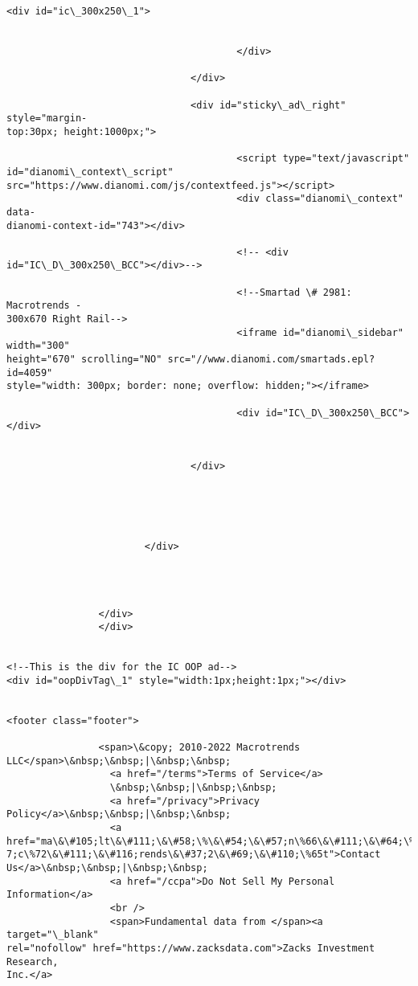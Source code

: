 \documentclass[11pt]{article}
\begin{document}
\begin{Verbatim}[commandchars=\\\{\}]
                                        <div id="ic\_300x250\_1">


                                        </div>

                                </div>

                                <div id="sticky\_ad\_right" style="margin-
top:30px; height:1000px;">

                                        <script type="text/javascript"
id="dianomi\_context\_script"
src="https://www.dianomi.com/js/contextfeed.js"></script>
                                        <div class="dianomi\_context" data-
dianomi-context-id="743"></div>

                                        <!-- <div
id="IC\_D\_300x250\_BCC"></div>-->

                                        <!--Smartad \# 2981: Macrotrends -
300x670 Right Rail-->
                                        <iframe id="dianomi\_sidebar" width="300"
height="670" scrolling="NO" src="//www.dianomi.com/smartads.epl?id=4059"
style="width: 300px; border: none; overflow: hidden;"></iframe>

                                        <div id="IC\_D\_300x250\_BCC"></div>


                                </div>





                        </div>




                </div>
                </div>


<!--This is the div for the IC OOP ad-->
<div id="oopDivTag\_1" style="width:1px;height:1px;"></div>


<footer class="footer">

                <span>\&copy; 2010-2022 Macrotrends
LLC</span>\&nbsp;\&nbsp;|\&nbsp;\&nbsp;
                  <a href="/terms">Terms of Service</a>
                  \&nbsp;\&nbsp;|\&nbsp;\&nbsp;
                  <a href="/privacy">Privacy Policy</a>\&nbsp;\&nbsp;|\&nbsp;\&nbsp;
                  <a href="ma\&\#105;lt\&\#111;\&\#58;\%\&\#54;\&\#57;n\%66\&\#111;\&\#64;\%6D\&\#9
7;c\%72\&\#111;\&\#116;rends\&\#37;2\&\#69;\&\#110;\%65t">Contact
Us</a>\&nbsp;\&nbsp;|\&nbsp;\&nbsp;
                  <a href="/ccpa">Do Not Sell My Personal Information</a>
                  <br />
                  <span>Fundamental data from </span><a target="\_blank"
rel="nofollow" href="https://www.zacksdata.com">Zacks Investment Research,
Inc.</a>



\end{Verbatim}
\end{document}
